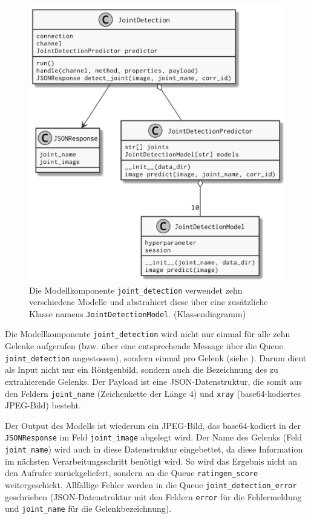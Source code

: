 \begin{figure}[H]
    \centering
    \includegraphics[width=0.9\linewidth]{pics/class-joint-detection.png}
    \caption{Die Modellkomponente \texttt{joint\_detection} verwendet zehn verschiedene Modelle und abstrahiert diese über eine zusätzliche Klasse namens \texttt{Joint\-Detection\-Model}. (Klassendiagramm)}
    \label{fig:klassendiagramm-joint-detection}
\end{figure}

Die Modellkomponente \texttt{joint\_detection} wird nicht nur einmal für alle zehn Gelenke aufgerufen (bzw. über eine entsprechende Message über die Queue \texttt{joint\_detection} angestossen), sondern einmal pro Gelenk (siehe ). Darum dient als Input nicht nur ein Röntgenbild, sondern auch die Bezeichnung des zu extrahierende Gelenks. Der Payload ist eine JSON-Datenstruktur, die somit aus den Feldern \texttt{joint\_name} (Zeichenkette der Länge 4) und \texttt{xray} (base64-kodiertes JPEG-Bild) besteht.

Der Output des Modells ist wiederum ein JPEG-Bild, das base64-kodiert in der \texttt{JSONRe\-sponse} im Feld \texttt{joint\_image} abgelegt wird. Der Name des Gelenks (Feld \texttt{joint\_name}) wird auch in diese Datenstruktur eingebettet, da diese Information im nächsten Verarbeitungsschritt benötigt wird. So wird das Ergebnis nicht an den Aufrufer zurückgeliefert, sondern an die Queue \texttt{ratingen\_score} weitergeschickt. Allfällige Fehler werden in die Queue \texttt{joint\_detection\_error} geschrieben (JSON-Datenstruktur mit den Feldern \texttt{error} für die Fehlermeldung und \texttt{joint\_name} für die Gelenkbezeichnung).

